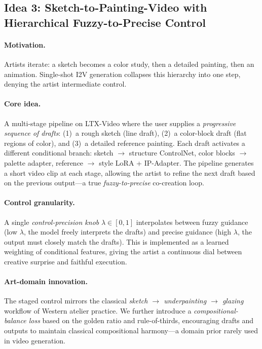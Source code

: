 \subsection{Idea 3: Sketch-to-Painting-Video with Hierarchical Fuzzy-to-Precise Control}
\label{sec:idea3}

\paragraph{Motivation.} Artists iterate: a sketch becomes a color study, then a
detailed painting, then an animation. Single-shot I2V generation collapses this
hierarchy into one step, denying the artist intermediate control.

\paragraph{Core idea.} A multi-stage pipeline on LTX-Video where the user supplies a
\emph{progressive sequence of drafts}:
(1)~a rough sketch (line draft),
(2)~a color-block draft (flat regions of color), and
(3)~a detailed reference painting. Each draft activates a different conditional branch:
sketch $\rightarrow$ structure ControlNet, color blocks $\rightarrow$ palette adapter,
reference $\rightarrow$ style LoRA + IP-Adapter. The pipeline generates a short video
clip at each stage, allowing the artist to refine the next draft based on the previous
output---a true \emph{fuzzy-to-precise} co-creation loop.

\paragraph{Control granularity.} A single \emph{control-precision knob} $\lambda \in [0,1]$
interpolates between fuzzy guidance (low $\lambda$, the model freely interprets the
drafts) and precise guidance (high $\lambda$, the output must closely match the
drafts). This is implemented as a learned weighting of conditional features, giving the
artist a continuous dial between creative surprise and faithful execution.

\paragraph{Art-domain innovation.} The staged control mirrors the classical
\emph{sketch $\rightarrow$ underpainting $\rightarrow$ glazing} workflow of Western
atelier practice. We further introduce a \emph{compositional-balance loss} based on the
golden ratio and rule-of-thirds, encouraging drafts and outputs to maintain classical
compositional harmony---a domain prior rarely used in video generation.

